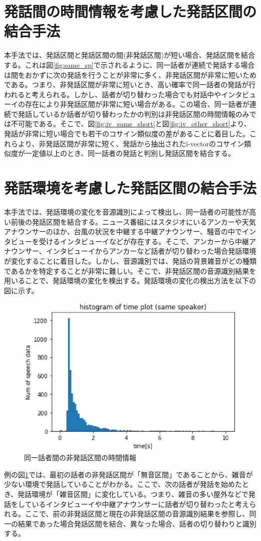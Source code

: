 \section{発話間の時間情報を考慮した発話区間の結合手法}
本手法では、発話区間と発話区間の間(非発話区間)が短い場合、発話区間を結合する。これは図\ref{fig:same_sp}で示されるように、同一話者が連続で発話する場合は間をおかずに次の発話を行うことが非常に多く、非発話区間が非常に短いためである。つまり、非発話区間が非常に短いとき、高い確率で同一話者の発話が行われると考えられる。しかし、話者が切り替わった場合でも対話中やインタビューイの存在により非発話区間が非常に短い場合がある。この場合、同一話者が連続で発話しているか話者が切り替わったかの判別は非発話区間の時間情報のみでは不可能である。そこで、図\ref{fig:iv_same_short}と図\ref{fig:iv_other_short}より、発話が非常に短い場合でも若干のコサイン類似度の差があることに着目した。これらより、非発話区間が非常に短く、発話から抽出されたi-vectorのコサイン類似度が一定値以上のとき、同一話者の発話と判別し発話区間を結合する。

\section{発話環境を考慮した発話区間の結合手法}
本手法では、発話環境の変化を音源識別によって検出し、同一話者の可能性が高い前後の発話区間を結合する。ニュース番組にはスタジオにいるアンカーや天気アナウンサーのほか、台風の状況を中継する中継アナウンサー、騒音の中でインタビューを受けるインタビューイなどが存在する。そこで、アンカーから中継アナウンサー、インタビューイからアンカーなど話者が切り替わった場合発話環境が変化することに着目した。しかし、音源識別では、発話の背景雑音がどの種類であるかを特定することが非常に難しい。そこで、非発話区間の音源識別結果を用いることで、発話環境の変化を検出する。発話環境の変化の検出方法を以下の図に示す。\par

\begin{figure}[htb]
  \begin{center}
    \includegraphics{./figure/same_sp.eps}
  \end{center}
  \caption{同一話者間の非発話区間の時間情報 \label{fig:flow_prob2}}
\end{figure}

例の図\ref{fig:flow_prob2}では、最初の話者の非発話区間が「無音区間」であることから、雑音が少ない環境で発話していることがわかる。ここで、次の話者が発話を始めたとき、発話環境が「雑音区間」に変化している。つまり、雑音の多い屋外などで発話をしているインタビューイや中継アナウンサーに話者が切り替わったと考えられる。ここで、前の非発話区間と現在の非発話区間の音源識別結果を参照し、同一の結果であった場合発話区間を結合、異なった場合、話者の切り替わりと識別する。
